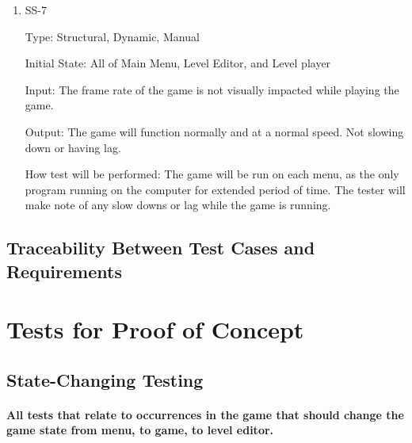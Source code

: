 \documentclass[12pt, titlepage]{article}
\begin{document}
\begin{enumerate}
\color{red}
\item{SS-7}

Type: Structural, Dynamic, Manual

Initial State: All of Main Menu, Level Editor, and Level player

Input: The frame rate of the game is not visually impacted while playing the game.

Output: The game will function normally and at a normal speed. Not slowing down or having lag.

How test will be performed: The game will be run on each menu, as the only program running on the computer for extended period of time. The tester will make note of any slow downs or lag while the game is running.


\color{black}

\end{enumerate}

\subsection{Traceability Between Test Cases and Requirements}

\section{Tests for Proof of Concept}

\color{Red}
\subsection{State-Changing Testing}
		
\paragraph{All tests that relate to occurrences in the game that should change the game state from menu, to game, to level editor.}
\end{document}
